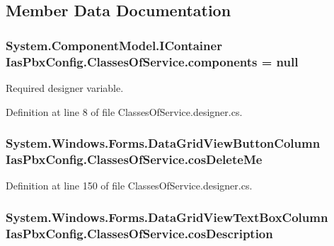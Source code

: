 \subsection{Member Data Documentation}
\hypertarget{class_ias_pbx_config_1_1_classes_of_service_aec5a05c9db08d37a3f6925314fedbe7d}{
\subsubsection[{components}]{\setlength{\rightskip}{0pt plus 5cm}System.ComponentModel.IContainer {\bf IasPbxConfig.ClassesOfService.components} = null}}
\label{class_ias_pbx_config_1_1_classes_of_service_aec5a05c9db08d37a3f6925314fedbe7d}


Required designer variable. 

Definition at line 8 of file ClassesOfService.designer.cs.\hypertarget{class_ias_pbx_config_1_1_classes_of_service_a213011b8964d3c83228bc86b511ef6ab}{
\subsubsection[{cosDeleteMe}]{\setlength{\rightskip}{0pt plus 5cm}System.Windows.Forms.DataGridViewButtonColumn {\bf IasPbxConfig.ClassesOfService.cosDeleteMe}}}
\label{class_ias_pbx_config_1_1_classes_of_service_a213011b8964d3c83228bc86b511ef6ab}


Definition at line 150 of file ClassesOfService.designer.cs.\hypertarget{class_ias_pbx_config_1_1_classes_of_service_a8a81e78ec29741481d934d0804f6322c}{
\subsubsection[{cosDescription}]{\setlength{\rightskip}{0pt plus 5cm}System.Windows.Forms.DataGridViewTextBoxColumn {\bf IasPbxConfig.ClassesOfService.cosDescription}}}
\label{class_ias_pbx_config_1_1_classes_of_service_a8a81e78ec29741481d934d0804f6322c}


